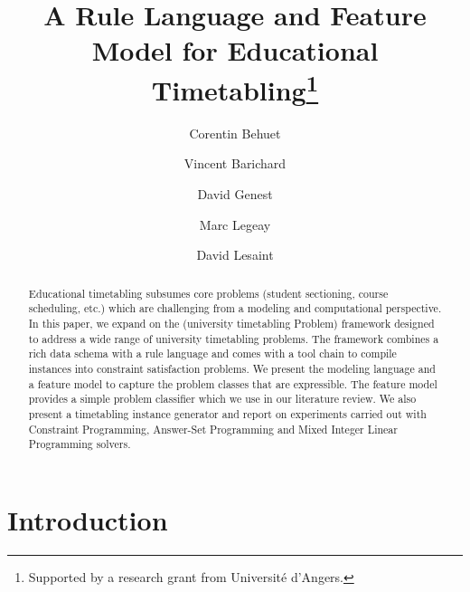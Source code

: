 \documentclass[runningheads]{llncs}
\begin{document}
\newcommand{\attending}{attending}
\newcommand{\studentoverlap}{session-overlap}
\newcommand{\sectioning}{sectioning}

\newcommand{\aspects}{crosscutting}
\newcommand{\availability}{calendar}
\newcommand{\periodicity}{regularity}
\newcommand{\sessiondistribution}{orchestration}
\newcommand{\travel}{workload}
\newcommand{\adjacency}{logistics}
\newcommand{\resourcedistribution}{resourcing}




\newcommand{\medcirc}{\text{\raisebox{0.25ex}{\large$\circ$}}}
\newcommand{\medbullet}{\text{\raisebox{0.25ex}{\large$\bullet$}}}\clearpage{}

\title{A Rule Language and Feature Model for Educational Timetabling\thanks{Supported by a research grant from Université d'Angers.}}
\author{
Corentin Behuet \and
Vincent Barichard \and
David Genest \and
Marc Legeay \and
David Lesaint
}
\maketitle              

\begin{abstract}
Educational timetabling
subsumes core problems
(student sectioning,
course scheduling, 
etc.)
which are challenging from a modeling and computational perspective.
In this paper, we expand on the \UTP{} 
(university timetabling Problem) 
framework designed to address a wide range of university timetabling problems.
The framework combines a rich data schema with a rule language
and comes with a tool chain to compile instances 
into constraint satisfaction problems.
We present the \UTP{} modeling language
and a feature model
to capture the problem classes that are expressible. The feature model provides a simple problem classifier which we use in our literature review. We also present a timetabling instance generator
and report on experiments carried out 
with Constraint Programming, 
Answer-Set Programming and 
Mixed Integer Linear Programming solvers. 

\end{abstract} \section{Introduction}
\end{document}
